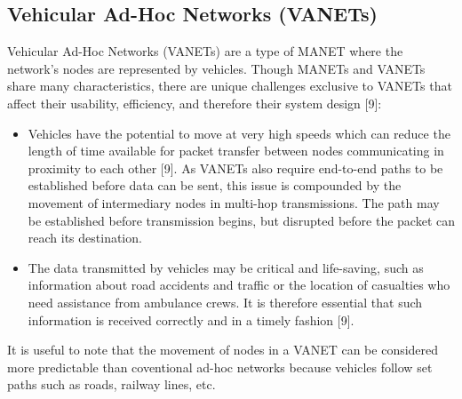 \documentclass{article}
\begin{document}
\subsection{Vehicular Ad-Hoc Networks (VANETs)}
Vehicular Ad-Hoc Networks (VANETs) are a type of MANET where the network's nodes are represented by vehicles. Though MANETs and VANETs share many characteristics, there are unique challenges exclusive to VANETs that affect their usability, efficiency, and therefore their system design [9]:
\begin{itemize}
	\item Vehicles have the potential to move at very high speeds which can reduce the length of time available for packet transfer between nodes communicating in proximity to each other [9]. As VANETs also require end-to-end paths to be established before data can be sent, this issue is compounded by the movement of intermediary nodes in multi-hop transmissions. The path may be established before transmission begins, but disrupted before the packet can reach its destination.
	\item The data transmitted by vehicles may be critical and life-saving, such as information about road accidents and traffic or the location of casualties who need assistance from ambulance crews. It is therefore essential that such information is received correctly and in a timely fashion [9].
\end{itemize}
It is useful to note that the movement of nodes in a VANET can be considered more predictable than coventional ad-hoc networks because vehicles follow set paths such as roads, railway lines, etc.
\end{document}
